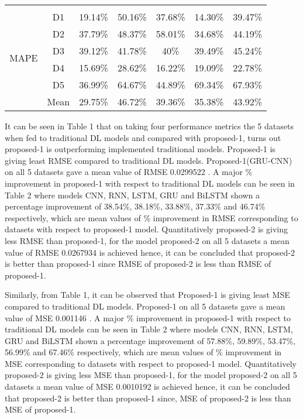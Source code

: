 \begin{table}[!h]
{\begin{tabular}{ccccccc}
        \midrule
        \multirow{7}{*}{MAPE}\\
        & D1 & 19.14\% & 50.16\% & 37.68\% & 14.30\% & 39.47\%\\
        & D2 & 37.79\% & 48.37\% & 58.01\% & 34.68\% & 44.19\%\\
        & D3 & 39.12\% & 41.78\% & 40\% & 39.49\% & 45.24\%\\
        & D4 & 15.69\% & 28.62\% & 16.22\% & 19.09\% & 22.78\%\\
        & D5 & 36.99\% & 64.67\% & 44.89\% & 69.34\% & 67.93\%\\
        & Mean & 29.75\% & 46.72\% & 39.36\% & 35.38\% & 43.92\%\\ 
        \bottomrule
    \end{tabular}}
\end{table}  

It can be seen in Table 1 that on taking four performance metrics the 5 datasets when fed to traditional DL models and compared with proposed-1,  turns out proposed-1 is outperforming implemented traditional models. Proposed-1 is giving least RMSE compared to traditional DL models. Proposed-1(GRU-CNN) on all 5 datasets gave a mean value of RMSE 0.0299522 . A major \% improvement in proposed-1 with respect to traditional DL models can be seen in Table 2 where models CNN,  RNN,  LSTM,  GRU and BiLSTM shown a percentage improvement of 38.54\%,  38.18\%,  33.88\%,  37.33\% and 46.74\% respectively,  which are mean values of \% improvement in RMSE corresponding to datasets with respect to proposed-1 model. Quantitatively proposed-2 is giving less RMSE than proposed-1,  for the model proposed-2 on all 5 datasets a mean value of RMSE 0.0267934 is achieved hence,  it can be concluded that proposed-2 is better than proposed-1 since RMSE of proposed-2 is less than RMSE of proposed-1. 

Similarly,  from Table 1, it can be observed that  Proposed-1 is giving least MSE compared to traditional DL models. Proposed-1 on all 5 datasets gave a mean value of MSE 0.001146 . A major \% improvement in proposed-1 with respect to traditional DL models can be seen in Table 2 where models CNN,  RNN,  LSTM,  GRU and BiLSTM shown a percentage improvement of 57.88\%,  59.89\%,  53.47\%,  56.99\% and 67.46\% respectively,  which are mean values of \% improvement in MSE corresponding to datasets with respect to proposed-1 model. Quantitatively proposed-2 is giving less MSE than proposed-1,  for the model proposed-2 on all 5 datasets a mean value of MSE 0.0010192 is achieved hence,  it can be concluded that proposed-2 is better than proposed-1 since,  MSE of proposed-2 is less than MSE of proposed-1. 

